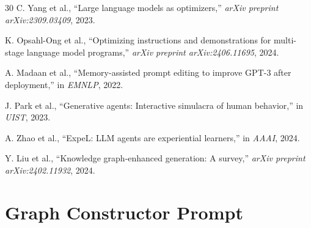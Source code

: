 \documentclass[12pt,a4paper]{article}
\begin{document}
\begin{thebibliography}{30}
C. Yang et al., ``Large language models as optimizers,'' \textit{arXiv preprint arXiv:2309.03409}, 2023.

K. Opsahl-Ong et al., ``Optimizing instructions and demonstrations for multi-stage language model programs,'' \textit{arXiv preprint arXiv:2406.11695}, 2024.

A. Madaan et al., ``Memory-assisted prompt editing to improve GPT-3 after deployment,'' in \textit{EMNLP}, 2022.

J. Park et al., ``Generative agents: Interactive simulacra of human behavior,'' in \textit{UIST}, 2023.

A. Zhao et al., ``ExpeL: LLM agents are experiential learners,'' in \textit{AAAI}, 2024.

Y. Liu et al., ``Knowledge graph-enhanced generation: A survey,'' \textit{arXiv preprint arXiv:2402.11932}, 2024.

\end{thebibliography}


\appendix

\section{Graph Constructor Prompt}
\label{app:prompts}
\end{document}
